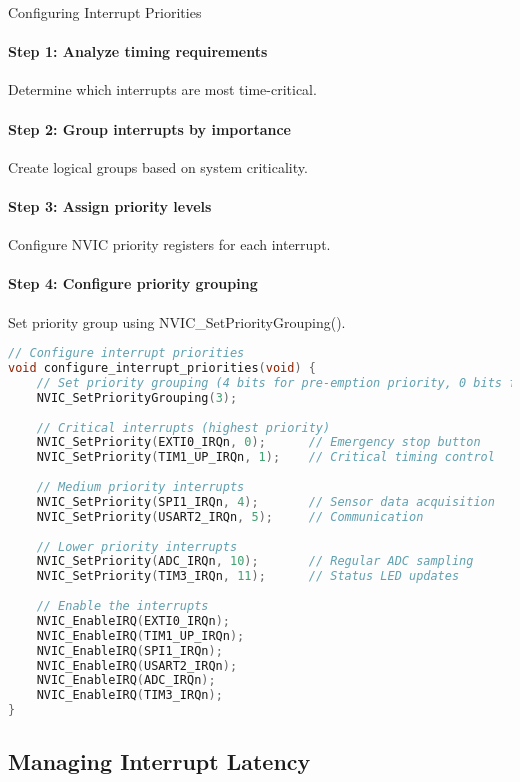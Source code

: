 \begin{KR}{Configuring Interrupt Priorities}
\paragraph{Step 1: Analyze timing requirements}
Determine which interrupts are most time-critical.
\paragraph{Step 2: Group interrupts by importance}
Create logical groups based on system criticality.
\paragraph{Step 3: Assign priority levels}
Configure NVIC priority registers for each interrupt.
\paragraph{Step 4: Configure priority grouping}
Set priority group using NVIC\_SetPriorityGrouping().

\begin{lstlisting}[language=C, style=basesmol]
// Configure interrupt priorities
void configure_interrupt_priorities(void) {
    // Set priority grouping (4 bits for pre-emption priority, 0 bits for sub-priority)
    NVIC_SetPriorityGrouping(3);
    
    // Critical interrupts (highest priority)
    NVIC_SetPriority(EXTI0_IRQn, 0);      // Emergency stop button
    NVIC_SetPriority(TIM1_UP_IRQn, 1);    // Critical timing control
    
    // Medium priority interrupts
    NVIC_SetPriority(SPI1_IRQn, 4);       // Sensor data acquisition
    NVIC_SetPriority(USART2_IRQn, 5);     // Communication
    
    // Lower priority interrupts
    NVIC_SetPriority(ADC_IRQn, 10);       // Regular ADC sampling
    NVIC_SetPriority(TIM3_IRQn, 11);      // Status LED updates
    
    // Enable the interrupts
    NVIC_EnableIRQ(EXTI0_IRQn);
    NVIC_EnableIRQ(TIM1_UP_IRQn);
    NVIC_EnableIRQ(SPI1_IRQn);
    NVIC_EnableIRQ(USART2_IRQn);
    NVIC_EnableIRQ(ADC_IRQn);
    NVIC_EnableIRQ(TIM3_IRQn);
}
\end{lstlisting}
\end{KR}

\raggedcolumns
\columnbreak

\subsection{Managing Interrupt Latency}

